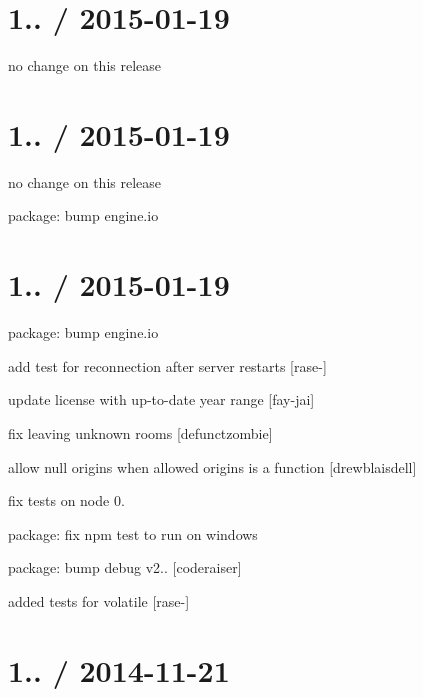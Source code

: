\section*{1.. / 2015-\/01-\/19 }


\begin{DoxyItemize}
\item no change on this release
\end{DoxyItemize}

\section*{1.. / 2015-\/01-\/19 }


\begin{DoxyItemize}
\item no change on this release
\item package\+: bump {\ttfamily engine.\+io}
\end{DoxyItemize}

\section*{1.. / 2015-\/01-\/19 }


\begin{DoxyItemize}
\item package\+: bump {\ttfamily engine.\+io}
\item add test for reconnection after server restarts \mbox{[}rase-\/\mbox{]}
\item update license with up-\/to-\/date year range \mbox{[}fay-\/jai\mbox{]}
\item fix leaving unknown rooms \mbox{[}defunctzombie\mbox{]}
\item allow null origins when allowed origins is a function \mbox{[}drewblaisdell\mbox{]}
\item fix tests on node 0.
\item package\+: fix {\ttfamily npm test} to run on windows
\item package\+: bump {\ttfamily debug} v2.. \mbox{[}coderaiser\mbox{]}
\item added tests for volatile \mbox{[}rase-\/\mbox{]}
\end{DoxyItemize}

\section*{1.. / 2014-\/11-\/21 }


